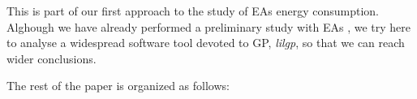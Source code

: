 This is part of our first approach to the study of EAs energy consumption.  Alghough we have already performed a preliminary study with EAs \cite{MAEB}, we try here to analyse a widespread software tool devoted to GP, \textit{lilgp}, so that we can reach wider conclusions.

The rest of the paper is organized as follows:  

